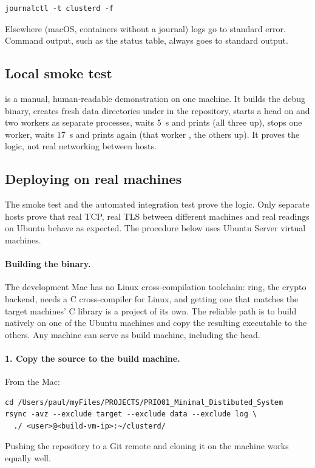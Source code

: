 \documentclass{article}
\begin{document}
\begin{verbatim}
journalctl -t clusterd -f
\end{verbatim}

Elsewhere (macOS, containers without a journal) logs go to standard
error. Command output, such as the status table, always goes to standard
output.

\subsection{Local smoke test}

 is a manual, human-readable demonstration on
one machine. It builds the debug binary, creates fresh data directories
under  in the repository, starts a head on
 and two workers as separate processes, waits 5~s
and prints  (all three up), stops one worker, waits 17~s and
prints  again (that worker , the others up). It
proves the logic, not real networking between hosts.

\subsection{Deploying on real machines}

The smoke test and the automated integration test prove the logic. Only
separate hosts prove that real TCP, real TLS between different machines
and real  readings on Ubuntu behave as expected. The
procedure below uses Ubuntu Server virtual machines.

\paragraph{Building the binary.}
The development Mac has no Linux cross-compilation toolchain: ring, the
crypto backend, needs a C cross-compiler for Linux, and getting one that
matches the target machines' C library is a project of its own. The
reliable path is to build natively on one of the Ubuntu machines and copy
the resulting executable to the others. Any machine can serve as build
machine, including the head.

\paragraph{1. Copy the source to the build machine.} From the Mac:
\begin{verbatim}
cd /Users/paul/myFiles/PROJECTS/PRIO01_Minimal_Distibuted_System
rsync -avz --exclude target --exclude data --exclude log \
  ./ <user>@<build-vm-ip>:~/clusterd/
\end{verbatim}
Pushing the repository to a Git remote and cloning it on the machine
works equally well.
\end{document}

